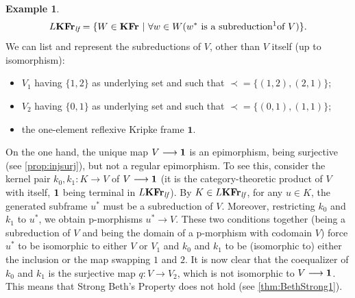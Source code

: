 \documentclass{article}
\theoremstyle{definition}
\newtheorem{example}{Example}
\newcommand{\KFr}{\textup{\textbf{KFr}}}
\newcommand{\lf}{\textit{lf}}
\begin{document}
\begin{example}
$$L\KFr_\lf = \{W \in \KFr\ \vert\ \forall w \in W(w^* \text{ is a subreduction\footnotemark of } V)\}.$$
We can list and represent the subreductions of $V$, other than $V$ itself (up to isomorphism):
\begin{itemize}
    \item $V_1$ having $\{1,2\}$ as underlying set and such that $\prec = \{(1,2),(2,1)\}$;
    \item $V_2$ having $\{0,1\}$ as underlying set and such that $\prec = \{(0,1),(1,1)\}$;
    \item the one-element reflexive Kripke frame $\mathbf{1}$.
\end{itemize}
\begin{center}
\end{center}

On the one hand, the unique map $V\longrightarrow \bf 1$ is an epimorphism, being surjective (see \cref{prop:injsurj}), but not a regular epimorphism. To see this, consider the kernel pair $k_0, k_1 \colon K \longrightarrow V$ of $V\longrightarrow \bf 1$ (it is the category-theoretic product of $V$ with itself, $\bf 1$ being terminal in $L\KFr_\lf$). By $K \in L\KFr_\lf$, for any $u \in K$, the generated subframe $u^*$ must be a subreduction of $V$. Moreover, restricting $k_0$ and $k_1$ to $u^*$, we obtain p-morphisms $u^* \longrightarrow V$. These two conditions together (being a subreduction of $V$ and being the domain of a p-morphism with codomain $V$) force $u^*$ to be isomorphic to either $V$ or $V_1$ and $k_0$ and $k_1$ to be (isomorphic to) either the inclusion or the map swapping $1$ and $2$. It is now clear that the coequalizer of $k_0$ and $k_1$ is the surjective map $q \colon V\longrightarrow V_2$, which is not isomorphic to $V \longrightarrow \bf 1$. This means that Strong Beth's Property does not hold (see \cref{thm:BethStrong1}).
 

\end{example}
\end{document}
